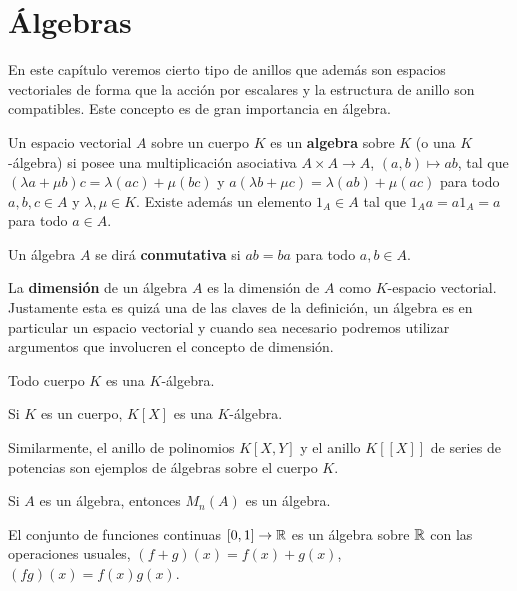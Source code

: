 \chapter{Álgebras}

En este capítulo veremos cierto tipo de anillos que además son espacios vectoriales de forma que
la acción por escalares y la estructura de anillo son compatibles. 
Este concepto es de gran importancia en álgebra. 

\begin{definition}
	\label{Álgebra}
	\label{Álgebra!asociativa}
	\label{Álgebra}
	Un espacio vectorial $A$ sobre un cuerpo $K$ es un \textbf{algebra} sobre $K$
	(o una $K$-álgebra) si posee una multiplicación asociativa $A\times A\to A$,
	$(a,b)\mapsto ab$, tal que
	$(\lambda a+\mu b)c=\lambda(ac)+\mu(bc)$ y 
	$a(\lambda b+\mu c)=\lambda(ab)+\mu(ac)$ 
	para todo $a,b,c\in A$ y $\lambda,\mu\in K$. Existe además un 
	elemento $1_A\in A$ tal que $1_Aa=a1_A=a$
	para todo $a\in A$.
\end{definition}

Un álgebra $A$ se dirá \textbf{conmutativa} si $ab=ba$ para todo $a,b\in A$. 

La \textbf{dimensión} de un álgebra $A$ es la dimensión de $A$ como $K$-espacio
vectorial. Justamente esta es quizá una de las claves de la definición, 
un álgebra es en particular un espacio vectorial y cuando sea necesario podremos 
utilizar argumentos que involucren el concepto de dimensión. 

\begin{example}
	Todo cuerpo $K$ es una $K$-álgebra. 
\end{example}

\begin{example}
	Si $K$ es un cuerpo, $K[X]$ es una $K$-álgebra. 
\end{example}

Similarmente, el anillo de polinomios $K[X,Y]$ y el anillo $K[[X]]$ de series de potencias son ejemplos de álgebras sobre el cuerpo $K$. 

\begin{example}
	Si $A$ es un álgebra, entonces $M_n(A)$ es un álgebra. 
\end{example}

\begin{example}
El conjunto de funciones continuas $[0,1]\to\mathbb{R}$ es un álgebra sobre $\mathbb{R}$ con las operaciones usuales, $(f+g)(x)=f(x)+g(x)$, $(fg)(x)=f(x)g(x)$. 
\end{example}


